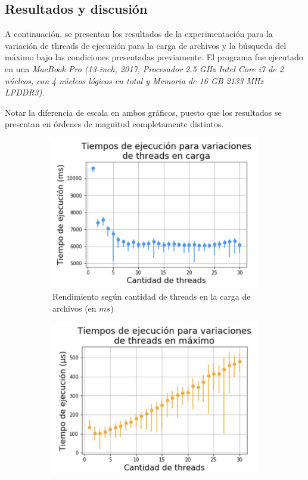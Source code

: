 \documentclass[a4paper]{article}
\begin{document}
\subsection{Resultados y discusión}

A continuación, se presentan los resultados de la experimentación para la variación de threads de ejecución para la carga de archivos y la búsqueda del máximo bajo las condiciones presentadas previamente. El programa fue ejecutado en una \textit{MacBook Pro (13-inch, 2017, Procesador 2.5 GHz Intel Core i7 de 2 núcleos, con 4 núcleos lógicos en total y Memoria de 16 GB 2133 MHz LPDDR3)}.

Notar la diferencia de escala en ambos gráficos, puesto que los resultados se presentan en órdenes de magnitud completamente distintos.

\begin{figure}[H]
    \begin{subfigure}{.5\textwidth}
        \centering
        \includegraphics[scale=0.275]{graphs/threadsCarga.jpeg}
        \caption{Rendimiento según cantidad de threads en la carga de archivos (en $ms$)}
        \label{res-carga}
    \end{subfigure}
    \begin{subfigure}{.5\textwidth}
        \centering
        \includegraphics[scale=0.275]{graphs/threadsMaximo.jpeg}

\end{subfigure}
\end{figure}
\end{document}
